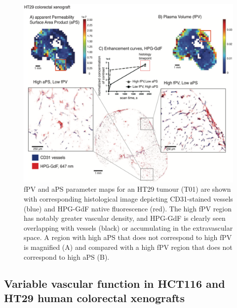 \begin{figure}[htbp]
 \begin{center}
 \includegraphics[width=\textwidth]{hpg/hpg-paper1-images/hpg_fig5-ht29fpv.png}
 \caption{\acs{fPV} and \acs{aPS} parameter maps for an HT29 tumour (T01) are shown with corresponding histological image depicting \acs{CD31}-stained vessels (blue) and \acs{HPG-GdF} native fluorescence (red).
 The high \acs{fPV} region has notably greater vascular density, and \acs{HPG-GdF} is clearly seen overlapping with vessels (black) or accumulating in the extravascular space.
 A region with high \acs{aPS} that does not correspond to high \acs{fPV} is magnified (A) and compared with a high \acs{fPV} region that does not correspond to high \acs{aPS} (B).}
 \label{hpgpaper1:fig5}
 \end{center}
\end{figure}

\subsection{Variable vascular function in HCT116 and HT29 human colorectal xenografts}

